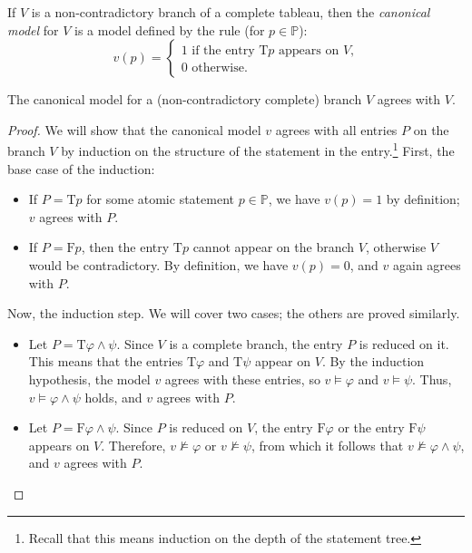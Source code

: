 \begin{definition}\label{definition:canonical-model}
If $V$ is a non-contradictory branch of a complete tableau, then the \emph{canonical model} for $V$ is a model defined by the rule (for $p \in \mathbb{P}$):
$$
v(p)=\begin{cases}
    1 \text{ if the entry $\mathrm{T}p$ appears on $V$,}\\
    0 \text{ otherwise.}
\end{cases}
$$  
\end{definition}
\begin{lemma}\label{lemma:canonical-model-agrees}
    The canonical model for a (non-contradictory complete) branch $V$ agrees with $V$.
\end{lemma}
\begin{proof}
We will show that the canonical model $v$ agrees with all entries $P$ on the branch $V$ by induction on the structure of the statement in the entry.\footnote{Recall that this means induction on the depth of the statement tree.} First, the base case of the induction:
\begin{itemize}
    \item If $P = \mathrm{T}p$ for some atomic statement $p \in \mathbb{P}$, we have $v(p) = 1$ by definition; $v$ agrees with $P$.
    \item If $P = \mathrm{F}p$, then the entry $\mathrm{T}p$ cannot appear on the branch $V$, otherwise $V$ would be contradictory. By definition, we have $v(p) = 0$, and $v$ again agrees with $P$.
\end{itemize}
Now, the induction step. We will cover two cases; the others are proved similarly.
\begin{itemize}
    \item Let $P = \mathrm{T}\varphi \land \psi$. Since $V$ is a complete branch, the entry $P$ is reduced on it. This means that the entries $\mathrm{T}\varphi$ and $\mathrm{T}\psi$ appear on $V$. By the induction hypothesis, the model $v$ agrees with these entries, so $v \models \varphi$ and $v \models \psi$. Thus, $v \models \varphi \land \psi$ holds, and $v$ agrees with $P$.
    \item Let $P = \mathrm{F}\varphi \land \psi$. Since $P$ is reduced on $V$, the entry $\mathrm{F}\varphi$ or the entry $\mathrm{F}\psi$ appears on $V$. Therefore, $v \not\models \varphi$ or $v \not\models \psi$, from which it follows that $v \not\models \varphi \land \psi$, and $v$ agrees with $P$.
\end{itemize}
\end{proof}

